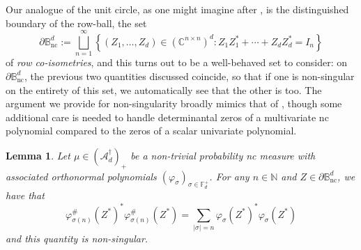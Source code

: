 \documentclass[11pt,reqno]{amsart}
\newcommand\ncm[1]{(\mathscr{A}_{#1}^{\dagger})_+}
\def\p{\varphi}
\def\s{\sigma}
\def\NN{\mathbb{N}}
\def\CC{\mathbb{C}}
\def\BB{\mathbb{B}}
\def\FF{\mathbb{F}}
\def\nc{\mathrm{nc}}
\def\dju{\bigsqcup_{n=1}^{\infty}}
\newtheorem{lemma}[theorem]{Lemma}
\theoremstyle{definition}
\numberwithin{equation}{section}
\begin{document}
Our analogue of the unit circle, as one might imagine after , is the distinguished boundary of the row-ball, the set
\[
    \partial \BB^d_\nc := \dju \left\{(Z_1, \ldots, Z_d) \in (\CC^{n \times n})^d : Z_1Z_1^* + \cdots + Z_dZ_d^* = I_n\right\}
\]
of \emph{row co-isometries}, and this turns out to be a well-behaved set to consider: on \(\partial \BB_\nc^d\), the previous two quantities discussed coincide, so that if one is non-singular on the entirety of this set, we automatically see that the other is too. The argument we provide for non-singularity broadly mimics that of \cite{Sim05}, though some additional care is needed to handle determinantal zeros of a multivariate nc polynomial compared to the zeros of a scalar univariate polynomial.

\begin{lemma}
    \label{lem:ZerosBoundary}
    Let \(\mu \in \ncm{d}\) be a non-trivial probability nc measure with associated orthonormal polynomials \((\p_\s)_{\s \in \FF_d^+}\). For any \(n \in \NN\) and \(Z \in \partial \BB^d_\nc\), we have that 
    \[
        \p_{\s(n)}^\#(Z^*)^* \p_{\s(n)}^\#(Z^*) = \sum_{\lvert \s \rvert = n} \p_\s(Z^*)^*\p_\s(Z^*)
    \]
    and this quantity is non-singular.
\end{lemma}  
\end{document}
